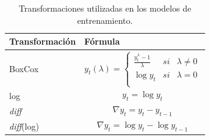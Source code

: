 \begin{table}[h]
	\centering
	\begin{tabular}{m{4cm} m{8cm}}
		\toprule
		\textbf{Transformación} & \textbf{\hspace{4cm}Fórmula}\\
		\midrule
		BoxCox			& 
		
		\begin{equation}
			\label{eqn:9}
			y_{t}(\lambda)= \left\{ \begin{array}{lcc}
				
				\frac{y_{t}^{\lambda} - 1}{\lambda} &   si  & \lambda \neq 0 \\
				\log{y_{t}} &  si & \lambda = 0 \\
				
			\end{array}
			\right.
		\end{equation}  
		\\ 
		log			&
		\begin{equation}
			\label{eqn:10}
			y_{t} = \log{y_{t}}
		\end{equation} \\
		\emph{diff} 			&
		\begin{equation}
			\label{eqn:11}
			\nabla y_{t} = y_{t} - y_{t-1}
		\end{equation}
		\\
		\emph{diff}(log)		& 
		\begin{equation}
			\label{eqn:12}
			\nabla y_{t} = \log{y_{t}} - \log{y_{t-1}}
		\end{equation}\\
		\bottomrule
		\hline
	\end{tabular}
	\caption{Transformaciones utilizadas en los modelos de entrenamiento.}
	\label{tab:Table9}
\end{table}



